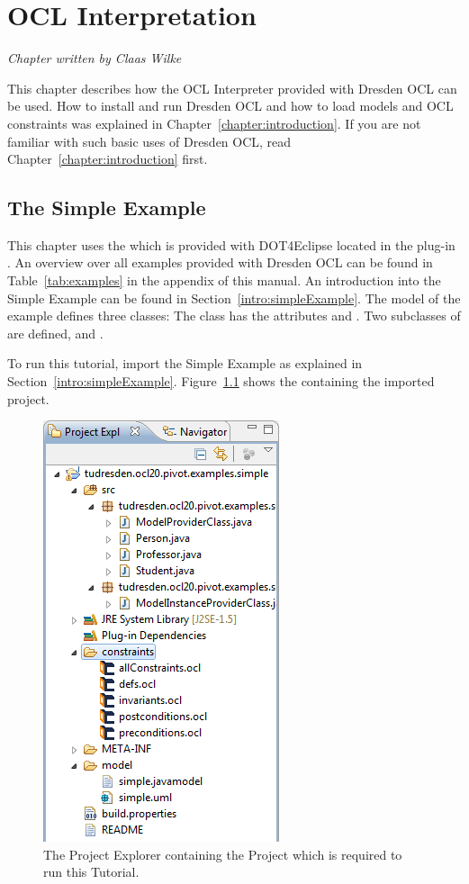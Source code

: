 \chapter{OCL Interpretation}
\label{chapter:interpretation}

\begin{flushright}
\textit{Chapter written by Claas Wilke}
\end{flushright}

This chapter describes how the \acs{OCL} Interpreter provided with Dresden OCL 
can be used. How to install and run Dresden OCL and how 
to load models and OCL constraints was explained in 
Chapter~\ref{chapter:introduction}. If you are not familiar with such basic uses
of Dresden OCL, read Chapter~\ref{chapter:introduction} first.



\section{The Simple Example}

This chapter uses the  which is provided with 
\acl{DOT4Eclipse} located in the plug-in 
. An overview over
all examples provided with Dresden OCL can be found in 
Table~\ref{tab:examples} in the appendix of this manual. An introduction into
the Simple Example can be found in Section~\ref{intro:simpleExample}. The model 
of the example defines three classes: The class  has the 
attributes  and . Two subclasses of  are 
defined,  and .

To run this tutorial, import the Simple Example as explained in
Section~\ref{intro:simpleExample}. Figure~\ref{pic:example:simple02} shows the
 containing the imported project.

\begin{figure}[!t]
	\centering
	\includegraphics[width=0.45\linewidth]{figures/examples/simple02}
	\caption{The Project Explorer containing the Project which is required to run
	this Tutorial.}
	\label{pic:example:simple02}
\end{figure}
	
